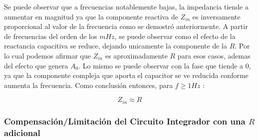 Se puede observar que a frecuencias notablemente bajas, la impedancia tiende a aumentar en magnitud ya que la componente reactiva de 
$Z_{in}$ es inversamente proporcional al valor de la frecuencia como se demostró anteriormente.
A partir de frecuencias del orden de los $mHz$, se puede observar como el efecto de la reactancia capacitiva 
se reduce, dejando unicamente la componente de la $R$. Por lo cual podemos afirmar que $Z_{in}$ es aproximadamente $R$ para esos casos, ademas del efecto que genera $A_0$.
Lo mismo se puede observar con la fase que tiende a 0, ya que la componente compleja que aporta el capacitor se ve reducida conforme aumenta la frecuencia.
Como conclusión entonces, para $f \geq 1Hz$ :

$$Z_{in} \approx R$$

\subsubsection{Compensación/Limitación del Circuito Integrador con una $R$ adicional}